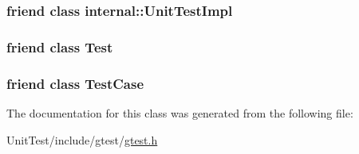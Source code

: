\hypertarget{classtesting_1_1_test_info_acc0a5e7573fd6ae7ad1878613bb86853}{
\subsubsection[{internal\+::\+Unit\+Test\+Impl}]{\setlength{\rightskip}{0pt plus 5cm}friend class internal\+::\+Unit\+Test\+Impl\hspace{0.3cm}{\ttfamily [friend]}}}\label{classtesting_1_1_test_info_acc0a5e7573fd6ae7ad1878613bb86853}
\hypertarget{classtesting_1_1_test_info_a5b78b1c2e1fa07ffed92da365593eaa4}{
\subsubsection[{Test}]{\setlength{\rightskip}{0pt plus 5cm}friend class {\bf Test}\hspace{0.3cm}{\ttfamily [friend]}}}\label{classtesting_1_1_test_info_a5b78b1c2e1fa07ffed92da365593eaa4}
\hypertarget{classtesting_1_1_test_info_aff779e55b06adfa7c0088bd10253f0f0}{
\subsubsection[{Test\+Case}]{\setlength{\rightskip}{0pt plus 5cm}friend class {\bf Test\+Case}\hspace{0.3cm}{\ttfamily [friend]}}}\label{classtesting_1_1_test_info_aff779e55b06adfa7c0088bd10253f0f0}


The documentation for this class was generated from the following file\+:\begin{DoxyCompactItemize}
\item 
Unit\+Test/include/gtest/\hyperlink{gtest_8h}{gtest.\+h}\end{DoxyCompactItemize}
